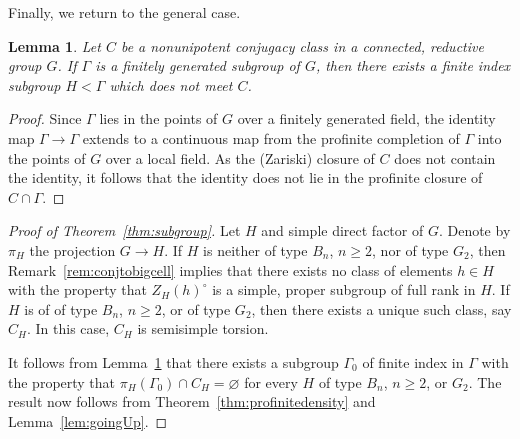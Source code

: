 \documentclass{amsart}
\theoremstyle{plain}
\newtheorem{lemma}[theorem]{Lemma}
\theoremstyle{definition}
\theoremstyle{remark}
\begin{document}
Finally, we return to the general case.
\begin{lemma}\label{lem:awayFromClass}
Let $C$ be a nonunipotent conjugacy class in a connected, reductive group $G$. If $\Gamma$
is a
finitely generated subgroup of $G$, then there exists a finite index subgroup $H < \Gamma$ which
does not meet $C$.
\end{lemma}
\begin{proof}
Since $\Gamma$ lies in the points of $G$ over a finitely generated field, the identity
map $\Gamma \to \Gamma$ extends to a continuous map from the profinite completion of $\Gamma$
into the points of $G$ over a local field. As the (Zariski) closure of $C$
does not contain the identity, it follows that the identity does not lie in the
profinite closure of $C \cap \Gamma$.
\end{proof}
\begin{proof}[Proof of Theorem~\ref{thm:subgroup}]
Let $H$ and simple direct factor of $G$. Denote by $\pi_{H}$ the projection $G
\to H$. If $H$ is neither of type $B_{n}$, $n \geqslant 2$, nor of type $G_{2}$, then
Remark~\ref{rem:conjtobigcell} implies that there exists no class of elements $h \in H$
with the property that $Z_{H}(h)^{\circ}$ is a simple, proper subgroup of full rank
in $H$. If $H$ is of of type $B_{n}$, $n \geqslant 2$, or of type $G_{2}$, then there
exists a unique such class, say $C_{H}$. In this case, $C_{H}$ is semisimple torsion.

It follows from Lemma~\ref{lem:awayFromClass} that there exists a subgroup $\Gamma_{0}$
of finite index in $\Gamma$ with the property that $\pi_{H}(\Gamma_{0}) \cap C_{H} =
\varnothing$ for every $H$ of type $B_{n}$, $n \geqslant 2$, or $G_{2}$. The result now
follows from Theorem~\ref{thm:profinitedensity} and Lemma~\ref{lem:goingUp}.
\end{proof}
\end{document}
